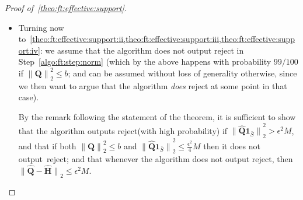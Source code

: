 \documentclass[11pt]{article}
\theoremstyle{definition}
\newcommand{\E}{\mathbb{E}}
\newcommand{\q}{\mathbf{Q}}
\newcommand{\h}{\mathbf{H}}
\newcommand{\eps}{\epsilon}
\newcommand{\abs}[1]{\lvert#1\rvert}
\newcommand{\norm}[1]{\lVert#1\rVert}
\newcommand{\Var}{\mathop{\textnormal{Var}}\nolimits}
\newcommand{\normtwo}[1]{{\norm{#1}}_2}
\renewcommand{\abs}[1]{\left\lvert #1 \right\rvert}
\newcommand{\reject}{\textsf{reject}\xspace}
\newcommand{\fourier}[1]{\widehat{#1}}
\begin{document}
\begin{proof}[Proof of~\cref{theo:ft:effective:support}]
\begin{itemize}
Moreover, if $\normtwo{\q}^2 \leq b$, then the same analysis shows that
\[
    \Pr[ X > \frac{3}{2}m^2b ] \leq \Pr\left[ \abs{ X - \E[ X ] } > \frac{1}{2}\E[ X ] \right]
    \leq 4\frac{\Var[ X ]}{\E[ X ]^2} \leq \frac{1}{100}
\]
and with probability at least $1-\frac{1}{100}$ the algorithm does not output \reject in Step~\ref{algo:ft:step:norm}.

  \item Turning now to~\cref{theo:ft:effective:support:ii,theo:ft:effective:support:iii,theo:ft:effective:support:iv}: we assume that the algorithm does not output \reject in Step~\ref{algo:ft:step:norm} (which by the above happens with probability $99/100$ if $\normtwo{\q}^2 \leq b$; and can be assumed without loss of generality otherwise, since we then want to argue that the algorithm \emph{does} reject at some point in that case).
  
    By the remark following the statement of the theorem, it is sufficient to show that the algorithm outputs \reject (with high probability) if $\normtwo{\fourier{\q}\mathbf{1}_{\bar{S}}}^2 > \eps^2 M$, and that if both $\normtwo{\q}^2 \leq b$ and $\normtwo{\fourier{\q}\mathbf{1}_{\bar{S}}}^2 \leq \frac{\eps^2}{4}M$ then it does not output~\reject; and that whenever the algorithm does not output \reject, then $\normtwo{\fourier{\q}-\fourier{\h}} \leq \eps^2 M$.
    

\end{itemize}
\end{proof}
\end{document}
